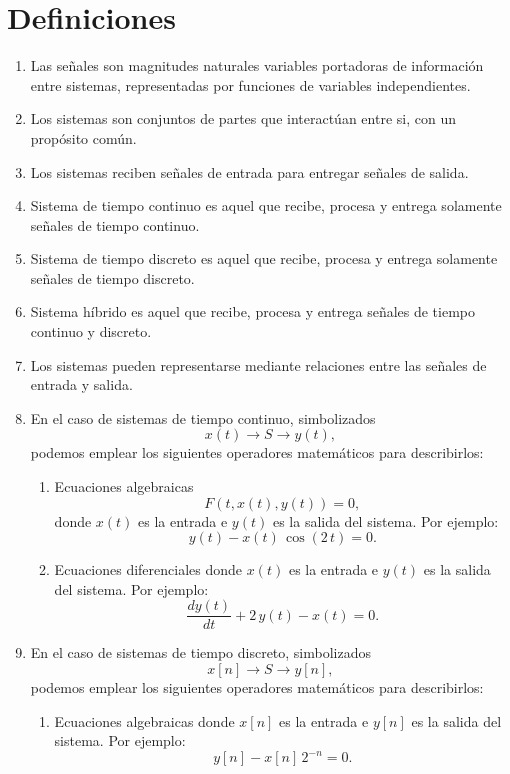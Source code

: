\documentclass[11pt,a4paper,openany]{book}
\begin{document}
\section{Definiciones}

\begin{enumerate}
	\item Las señales son magnitudes naturales variables portadoras de información entre sistemas, representadas por funciones de variables independientes.
	\item Los sistemas son conjuntos de partes que interactúan entre si, con un propósito común.
	\item Los sistemas reciben señales de entrada para entregar señales de salida.
	\item Sistema de tiempo continuo es aquel que recibe, procesa y entrega solamente señales de tiempo continuo.
	\item Sistema de tiempo discreto es aquel que recibe, procesa y entrega solamente señales de tiempo discreto.
	\item Sistema híbrido es aquel que recibe, procesa y entrega señales de tiempo continuo y discreto.
	\item Los sistemas pueden representarse mediante relaciones entre las señales de entrada y salida.
	\item En el caso de sistemas de tiempo continuo, simbolizados
	\begin{equation}
		x(t) \rightarrow S \rightarrow y(t),
	\end{equation}
	podemos emplear los siguientes operadores matemáticos para describirlos:
	\begin{enumerate}
		\item Ecuaciones algebraicas
		\begin{equation}
			F(t, x(t), y(t)) = 0,
		\end{equation}
		donde $x(t)$ es la entrada e $y(t)$ es la salida del sistema. Por ejemplo:
		\begin{equation}
			y(t) - x(t) \, \cos(2 \, t) = 0.
		\end{equation}
		
		\item Ecuaciones diferenciales donde $x(t)$ es la entrada e $y(t)$ es la salida del sistema. Por ejemplo:
		\begin{equation}
			\frac{d y(t)}{dt} + 2 \, y(t) - x(t) = 0.
		\end{equation}
	\end{enumerate}
	
	\item En el caso de sistemas de tiempo discreto, simbolizados
	\begin{equation}
		x[n] \rightarrow S \rightarrow y[n],
	\end{equation}
	podemos emplear los siguientes operadores matemáticos para describirlos:
	\begin{enumerate}
		\item Ecuaciones algebraicas donde $x[n]$ es la entrada e $y[n]$ es la salida del sistema. Por ejemplo:
		\begin{equation}
			y[n] - x[n] \, 2^{-n} = 0.
		\end{equation}
		

\end{enumerate}
\end{enumerate}
\end{document}
